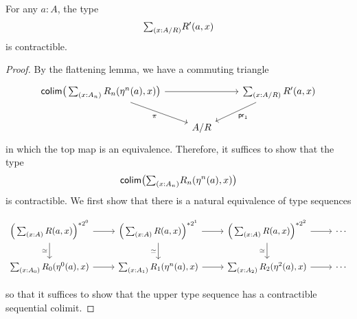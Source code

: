\documentclass[reqno]{amsart}
\begin{document}
\begin{thm}
For any $a:A$, the type
\begin{equation*}
\sm{x:A/R} R'(a,x)
\end{equation*}
is contractible.
\end{thm}

\begin{proof}
By the flattening lemma, we have a commuting triangle
\begin{equation*}
\begin{tikzcd}
\tfcolim\big(\sm{x:A_n} R_n(\eta^n(a),x)\big) \arrow[rr] \arrow[dr,swap,"\pi"] & & \sm{x:A/R} R'(a,x) \arrow[dl,"\proj 1"] \\
& A/R
\end{tikzcd}
\end{equation*}
in which the top map is an equivalence. Therefore, it suffices to show that the
type 
\begin{equation*}
\tfcolim\big(\sm{x:A_n} R_n(\eta^n(a),x)\big)
\end{equation*}
is contractible. We first show that there is a natural equivalence of type sequences
\begin{small}
\begin{equation*}
\begin{tikzcd}
\Big(\sm{x:A}R(a,x)\Big)^{\ast 2^0} \arrow[r] \arrow[d,swap,"\eqvsym"] & \Big(\sm{x:A}R(a,x)\Big)^{\ast 2^1} \arrow[r] \arrow[d,swap,"\eqvsym"] & \Big(\sm{x:A}R(a,x)\Big)^{\ast 2^2} \arrow[r] \arrow[d,swap,"\eqvsym"] & \cdots \\
\sm{x:A_0} R_0(\eta^0(a),x) \arrow[r] & \sm{x:A_1} R_1(\eta^n(a),x) \arrow[r] & \sm{x:A_2} R_2(\eta^2(a),x) \arrow[r] & \cdots
\end{tikzcd}
\end{equation*}
\end{small}
so that it suffices to show that the upper type sequence has a contractible sequential colimit.


\end{proof}
\end{document}
